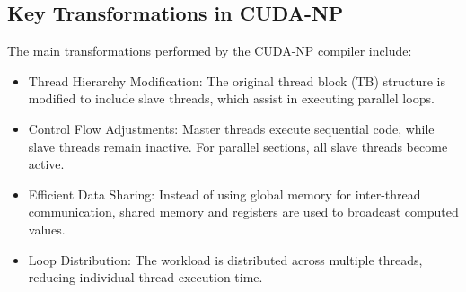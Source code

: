 \documentclass{report}
\begin{document}
\subsection{Key Transformations in CUDA-NP}
The main transformations performed by the CUDA-NP compiler include:
\begin{itemize}
    \item Thread Hierarchy Modification: The original thread block (TB) structure is modified to include slave threads, which assist in executing parallel loops.
    \item Control Flow Adjustments: Master threads execute sequential code, while slave threads remain inactive. For parallel sections, all slave threads become active.
    \item Efficient Data Sharing: Instead of using global memory for inter-thread communication, shared memory and registers are used to broadcast computed values.
    \item Loop Distribution: The workload is distributed across multiple threads, reducing individual thread execution time.
\end{itemize}
\end{document}
